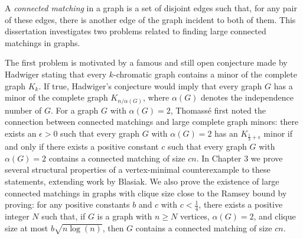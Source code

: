 \pagestyle{plain}
\setlength{\textwidth}{6in}
\setlength{\oddsidemargin}{0in}
\setlength{\textheight}{7in}
\setlength{\oddsidemargin}{0in}
\setlength{\topmargin}{0in}
\setlength{\headheight}{0in}
\setlength{\headsep}{0in}
\setlength{\parskip}{8pt}
\setlength{\parindent}{0pt}


\title{}
\author{Abstract}
\date{}
 
\maketitle
A {\em connected matching} in a graph is a set of disjoint edges such that, for any pair of these edges,
there is another edge of the graph incident to both of them.
This dissertation investigates two problems related to finding large connected matchings in graphs.

The first problem is motivated by a famous and still open conjecture made by Hadwiger stating
that every $k$-chromatic graph contains a minor of the complete graph $K_k$.  If true, Hadwiger's conjecture
would imply that every graph $G$ has a minor of the complete graph $K_{n/\alpha(G)}$, where $\alpha(G)$
denotes the independence number of $G$.
For a graph $G$ with $\alpha(G)=2$, Thomass\'{e} first noted the connection between connected matchings
and large complete graph minors: there exists an $\epsilon>0$ such that every graph $G$ with $\alpha(G)=2$
has an $K_{\frac{1}{3}+\epsilon}$ minor if and only if there exists a positive constant $c$ such that 
every graph $G$ with $\alpha(G)=2$ contains a connected matching of size $c n$.  
In Chapter 3 we prove several structural properties of a vertex-minimal counterexample to these statements, 
extending work by Blasiak.
We also prove the existence of large connected matchings in graphs with clique size close to the Ramsey bound by proving:
for any positive constants $b$ and $c$ with $c<\frac{1}{4}$, there exists a positive integer $N$ such that,
if $G$ is a graph with $n\geq N$ vertices, $\alpha(G)=2$, and clique size at most $b \sqrt{n \log(n)}$,
then $G$ contains a connected matching of size $cn$.

